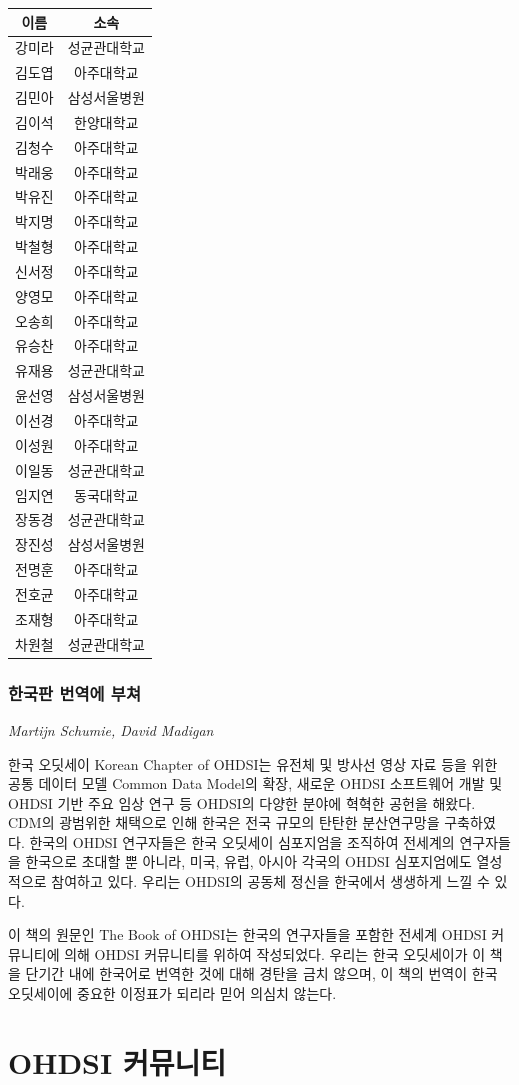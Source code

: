 \documentclass[10.5pt]{book}
\theoremstyle{definition}
\theoremstyle{definition}
\theoremstyle{definition}
\theoremstyle{remark}
\begin{document}
\begin{longtable}[]{@{}cc@{}}
\toprule
이름 & 소속\tabularnewline
\midrule
\endhead
강미라 & 성균관대학교\tabularnewline
김도엽 & 아주대학교\tabularnewline
김민아 & 삼성서울병원\tabularnewline
김이석 & 한양대학교\tabularnewline
김청수 & 아주대학교\tabularnewline
박래웅 & 아주대학교\tabularnewline
박유진 & 아주대학교\tabularnewline
박지명 & 아주대학교\tabularnewline
박철형 & 아주대학교\tabularnewline
신서정 & 아주대학교\tabularnewline
양영모 & 아주대학교\tabularnewline
오송희 & 아주대학교\tabularnewline
유승찬 & 아주대학교\tabularnewline
유재용 & 성균관대학교\tabularnewline
윤선영 & 삼성서울병원\tabularnewline
이선경 & 아주대학교\tabularnewline
이성원 & 아주대학교\tabularnewline
이일동 & 성균관대학교\tabularnewline
임지연 & 동국대학교\tabularnewline
장동경 & 성균관대학교\tabularnewline
장진성 & 삼성서울병원\tabularnewline
전명훈 & 아주대학교\tabularnewline
전호균 & 아주대학교\tabularnewline
조재형 & 아주대학교\tabularnewline
차원철 & 성균관대학교\tabularnewline
\bottomrule
\end{longtable}

\section*{한국판 번역에 부쳐}\label{--}

\emph{Martijn Schumie, David Madigan}

한국 오딧세이 Korean Chapter of OHDSI는 유전체 및 방사선 영상 자료 등을
위한 공통 데이터 모델 Common Data Model의 확장, 새로운 OHDSI 소프트웨어
개발 및 OHDSI 기반 주요 임상 연구 등 OHDSI의 다양한 분야에 혁혁한 공헌을
해왔다. CDM의 광범위한 채택으로 인해 한국은 전국 규모의 탄탄한
분산연구망을 구축하였다. 한국의 OHDSI 연구자들은 한국 오딧세이
심포지엄을 조직하여 전세계의 연구자들을 한국으로 초대할 뿐 아니라, 미국,
유럽, 아시아 각국의 OHDSI 심포지엄에도 열성적으로 참여하고 있다. 우리는
OHDSI의 공동체 정신을 한국에서 생생하게 느낄 수 있다.

이 책의 원문인 The Book of OHDSI는 한국의 연구자들을 포함한 전세계 OHDSI
커뮤니티에 의해 OHDSI 커뮤니티를 위하여 작성되었다. 우리는 한국
오딧세이가 이 책을 단기간 내에 한국어로 번역한 것에 대해 경탄을 금치
않으며, 이 책의 번역이 한국 오딧세이에 중요한 이정표가 되리라 믿어
의심치 않는다.

\mainmatter

\part{OHDSI 커뮤니티}\label{part-ohdsi-}
\end{document}

